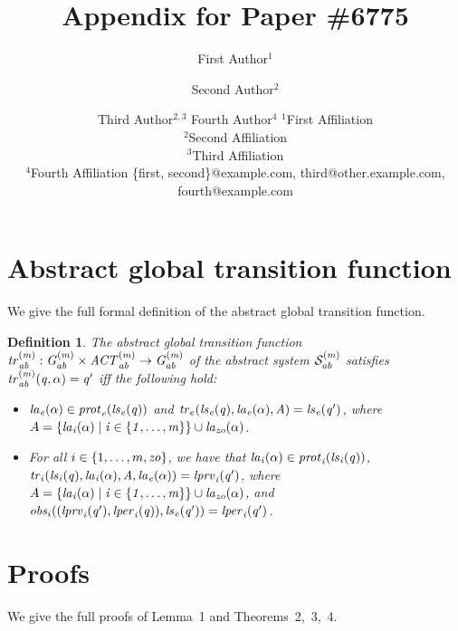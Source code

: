 \documentclass{article}
\title{Appendix for Paper \#6775}
\author{
}
\author{
First Author$^1$
\and
Second Author$^2$\and
Third Author$^{2,3}$\And
Fourth Author$^4$
\affiliations
$^1$First Affiliation\\
$^2$Second Affiliation\\
$^3$Third Affiliation\\
$^4$Fourth Affiliation
\emails
\{first, second\}@example.com,
third@other.example.com,
fourth@example.com
}
\newtheorem{definition}{Definition}
\begin{document}

\appendix



\section{Abstract global transition function} 
We give the full formal definition of the abstract global transition function.
\begin{definition}
  The {\em abstract global transition function} $\it{tr}^{(m)}_{ab} : G^{(m)}_{ab}
  \times \mathit{ACT}^{(m)}_{ab} \rightarrow G^{(m)}_{ab}$ of the abstract 
  system $\mathcal{S}^{(m)}_{ab}$ satisfies $\it{tr}^{(m)}_{ab}(q, \alpha) = q'$ iff the
  following hold:
  \begin{itemize}
    \item $\it{la}_{e}({\alpha}) \in \mathit{prot}_{e}({\it{ls}_{e}(q)})$ and $\mathit{tr}_{e}(\it{ls}_{e}(q),
        \it{la}_{e}({\alpha}), A) = \it{ls}_{e}(q')$, where
    $A = \left \{ \it{la}_{i}({\alpha}) \mid i \in \left \{ 1,\ldots,m \right \} \right \} \cup
\it{la}_{zo}({\alpha})$.
    \item For all $i \in \left \{ 1,\ldots,m, \it{zo} \right \}$, we have that
    $\it{la}_{i}({\alpha}) \in \mathit{prot}_{i}(\it{ls}_{i}(q))$, $\mathit{tr}_{i} (\it{ls}_{i}(q), \it{la}_{i}({\alpha}),
    A, \it{la}_{e}({\alpha})) = \it{lprv}_{i}(q')$, where  $A = \left \{ \it{la}_{i}({\alpha}) \mid i \in
    \left \{ 1,\ldots,m \right \} \right \} \cup \it{la}_{zo}({\alpha})$, and $\mathit{obs}_{i}((\it{lprv}_{i}(q'),\it{lper}_{i}(q)),\it{ls}_{e}(q')) = \it{lper}_{i}(q')$.
  \end{itemize}
\end{definition}

\section{Proofs}
We give the full proofs of Lemma~1 and Theorems~2,~3,~4.
\end{document}
